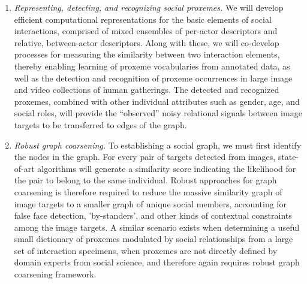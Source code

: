 \begin{enumerate}

\vspace{-0.1in}\item \emph{Representing, detecting, and recognizing social proxemes.} We will develop efficient computational representations for the basic elements of social interactions, comprised of mixed ensembles of per-actor descriptors and relative, between-actor descriptors. Along with these, we will co-develop processes for measuring the similarity between two interaction elements, thereby enabling learning of proxeme vocabularies from annotated data, as well as the detection and recognition of proxeme occurrences in large image and video collections of human gatherings. The detected and recognized proxemes, combined with other individual attributes such as gender, age, and social roles, will provide the ``observed'' noisy relational signals between image targets to be transferred to edges of the graph.

\vspace{-0.1in}\item \emph{Robust graph coarsening.} To establishing a social graph, we must first identify the nodes in the graph. For every pair of targets detected from images, state-of-art algorithms will generate a similarity score indicating the likelihood for the pair to belong to the same individual. Robust approaches for graph coarsening is therefore required to reduce the massive similarity graph of image targets to a smaller graph of unique social members, accounting for false face detection, 'by-standers', and other kinds of contextual constraints among the image targets. A similar scenario exists when determining a useful small dictionary of proxemes modulated by social relationships from a large set of interaction specimens, when proxemes are not directly defined by domain experts from social science, and therefore again requires robust graph coarsening framework.  



\end{enumerate}
